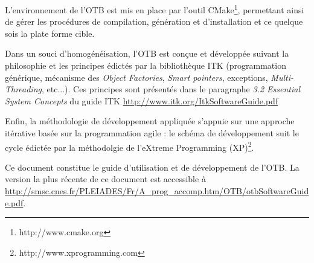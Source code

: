 L'environnement de l'OTB est mis en place par l'outil CMake\footnote{http://www.cmake.org}, 
permettant ainsi de g\'{e}rer les proc\'{e}dures de compilation, g\'{e}n\'{e}ration et d'installation et ce quelque sois la plate forme cible.

Dans un souci d'homog\'{e}n\'{e}isation, l'OTB est con\c{c}ue et d\'{e}velopp\'{e}e suivant la philosophie et les principes \'{e}dict\'{e}s 
par la biblioth\`{e}que ITK (programmation g\'{e}n\'{e}rique, m\'{e}canisme des \emph{Object Factories}, \emph{Smart pointers}, exceptions, \emph{Multi-Threading}, etc...). 
Ces principes sont pr\'{e}sent\'{e}s dans le paragraphe \emph{3.2 Essential System Concepts} du guide ITK \url{http://www.itk.org/ItkSoftwareGuide.pdf}

Enfin, la m\'{e}thodologie de d\'{e}veloppement appliqu\'{e}e s'appuie sur une approche it\'{e}rative bas\'{e}e sur la programmation agile : 
le sch\'{e}ma de d\'{e}veloppement suit le cycle \'{e}dict\'{e}e par la m\'{e}thodolgie de l'eXtreme Programming (XP)\footnote{http://www.xprogramming.com}.

 
 
Ce document constitue le guide d'utilisation et de d\'{e}veloppement de l'OTB. La version la plus r\'{e}cente de ce document est accessible \`{a} 
\url{http://smsc.cnes.fr/PLEIADES/Fr/A_prog_accomp.htm/OTB/otbSoftwareGuide.pdf}. 


